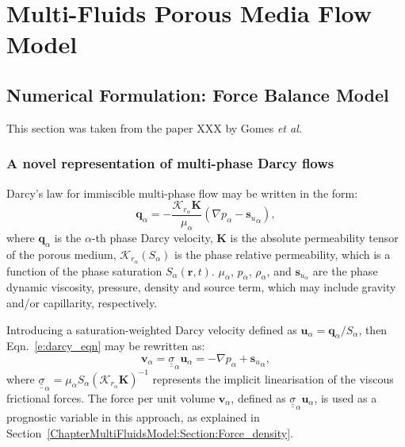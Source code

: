 
\chapter{Multi-Fluids Porous Media Flow Model}\label{ChapterMultiFluidsModel}

\section{Numerical Formulation: Force Balance Model}\label{ChapterMultiFluidsModel:Section:overlapping_method_section}
This section was taken from the paper XXX by Gomes {\it et al.}

\subsection{A novel representation of multi-phase Darcy flows}\label{ChapterMultiFluidsModel:Section:DarcyModel}
Darcy's law for immiscible multi-phase flow may be written in the form:
\begin{equation}\label{e:darcy_eqn}
  \mathbf{q}_{\alpha} = -\frac{\mathcal{K}_{{r}_\alpha}\mathbf{K}}{\mu_{\alpha}}\left(\nabla p_{\alpha} - {\mathbf{s}_{u}}_{\alpha} \right),
\end{equation}
where $\mathbf{q}_{\alpha}$ is the $\alpha$-th phase Darcy velocity, $\mathbf{K}$ is the absolute permeability tensor of the porous medium, $\mathcal{K}_{{r}_\alpha}\left(S_{\alpha}\right)$ is the phase relative permeability, which is a function of the phase saturation $S_{\alpha}\left(\mathbf{r},t\right)$. $\mu_{\alpha}$, $p_{\alpha}$, $\rho_{\alpha}$, and $\mathbf{s}_{{u}_\alpha}$ are the phase dynamic viscosity, pressure, density and source term, which may include gravity and/or capillarity, respectively. 

Introducing a saturation-weighted Darcy velocity defined as $\mathbf{u}_\alpha= \mathbf{q}_\alpha/S_\alpha$, then Eqn.~\ref{e:darcy_eqn} may be rewritten as:
\begin{equation}
  \mathbf{v}_\alpha={\underline {\underline \sigma}}_{\alpha} \mathbf{u}_{\alpha} = - \nabla p_{\alpha} + {\mathbf{s}_{u}}_{\alpha},
  \label{force-bal}
\end{equation}
where ${\underline {\underline \sigma}}_{\alpha}=\mu_\alpha S_\alpha \left(\mathcal{K}_{{r}_\alpha}\mathbf{K}\right)^{-1}$ represents the implicit linearisation of the viscous frictional forces. The force per unit volume $\mathbf{v}_\alpha$, defined as ${\underline {\underline \sigma}}_{\alpha} \mathbf{u}_\alpha$, is used as a prognostic variable in this approach, as explained in Section~\ref{ChapterMultiFluidsModel:Section:Force_density}.

